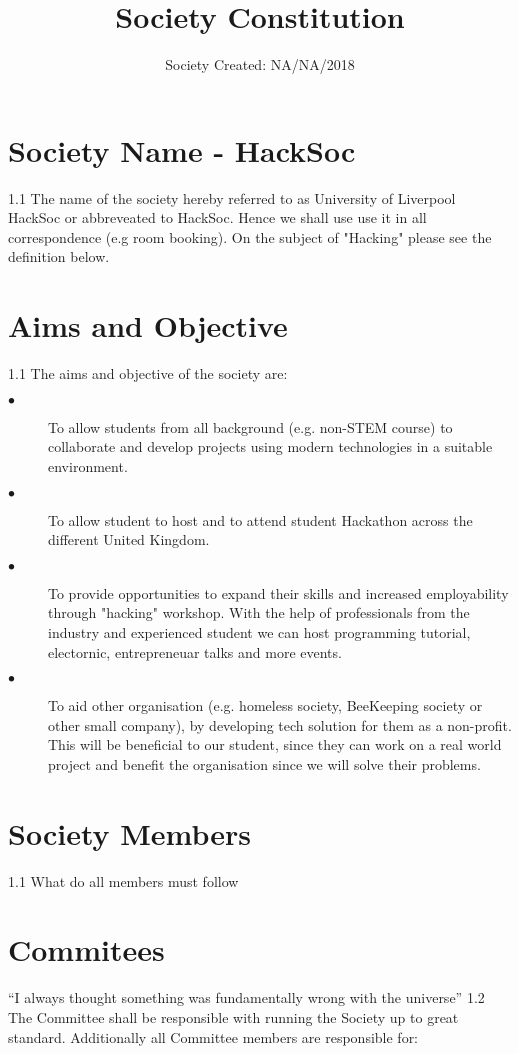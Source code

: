 \documentclass{article}
\title{Society Constitution}
\date{Society Created: NA/NA/2018}
\begin{document}
\maketitle

\section{Society Name - HackSoc}
1.1 The name of the society hereby referred to as University of Liverpool HackSoc or abbreveated to HackSoc. Hence we shall use use it in all correspondence (e.g room booking). On the subject of "Hacking" 
please see the definition below.

\section{Aims and Objective}
1.1 The aims and objective of the society are:
\begin{description}
  \item[$\bullet$] To allow students from all background (e.g. non-STEM course) to collaborate and develop projects using
  modern technologies in a suitable environment.
  \item[$\bullet$] To allow student to host and to attend student Hackathon across the different United Kingdom.
  \item[$\bullet$] To provide opportunities to expand their skills and increased employability
   through "hacking" workshop. With the help of professionals from the industry and experienced student we can host programming tutorial, electornic, entrepreneuar talks and more events.
  \item[$\bullet$] To aid other organisation (e.g. homeless society, BeeKeeping society or other small company), by developing tech solution for them as a non-profit. This will be beneficial to our student, since they can work on a real world project and benefit the organisation since we will solve their problems.
\end{description}


\section{Society Members}
1.1 What do all members must follow

\section{Commitees}
``I always thought something was fundamentally wrong with the universe'' \citep{adams1995hitchhiker}
1.2 The Committee shall be responsible with running the Society up to great standard. Additionally all Committee members are responsible for:
\end{document}
